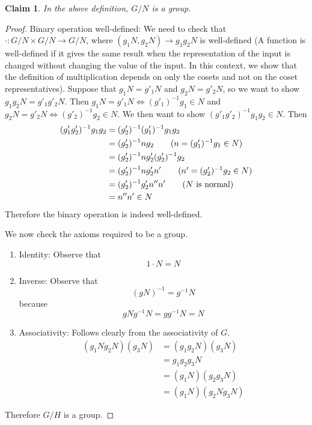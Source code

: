 \documentclass[12pt]{article}
\newtheorem{claim}{Claim}
\theoremstyle{definition}
\theoremstyle{definition}
\begin{document}
\begin{claim}
In the above definition, $G/N$ is a group. 
\end{claim}
\begin{proof}
Binary operation well-defined: We need to check that $\cdot: G/N \times G/N \to G/N$, where $(g_1N, g_2N) \to g_1 g_2 N$ is well-defined (A function is well-defined if it gives the same result when the representation of the input is changed without changing the value of the input. In this context, we show that the definition of multiplication depends on only the cosets and not on the coset representatives). Suppose that $g_1 N = g'_1 N$ and $g_2 N = g'_2 N$, so we want to show $g_1 g_2 N = g'_1 g'_2 N$. Then $g_1N = g'_1 N \iff (g'_1)^{-1} g_1 \in N$ and $g_2 N = g'_2 N \iff (g'_2)^{-1} g_2 \in N$. We then want to show $(g'_1g'_2)^{-1}g_1g_2 \in N$. Then
\begin{align*}
	(g'_1g'_2)^{-1}g_1g_2 &= (g'_2)^{-1} (g'_1)^{-1} g_1 g_2 \\
	&= (g'_2)^{-1} n g_2 \tag{$n = (g'_1)^{-1} g_1 \in N$} \\
	&= (g'_2)^{-1} n g'_2 (g'_2)^{-1} g_2 \\
	&= (g'_2)^{-1} n g'_2 n' \tag{$n' = (g'_2)^{-1} g_2 \in N$}\\
	&= (g'_2)^{-1} g'_2 n'' n' \tag{$N$ is normal}\\
	&= n'' n' \in N
\end{align*}
Therefore the binary operation is indeed well-defined. 

We now check the axioms required to be a group.

\begin{enumerate}
	\item Identity: Observe that
	\begin{equation}
		1 \cdot N = N
	\end{equation}

	\item Inverse: Observe that
	\begin{equation}
		(gN)^{-1} = g^{-1}N
	\end{equation}
	because 
	\begin{equation}
		gNg^{-1}N = gg^{-1} N = N
	\end{equation}

	\item Associativity: Follows clearly from the associativity of $G$. 
	\begin{align*}
		(g_1 N g_2 N)(g_3 N) &= (g_1 g_2 N)(g_3 N) \\
		&= g_1 g_2 g_3 N \\
		&= (g_1 N) (g_2 g_3 N) \\
		&= (g_1 N)(g_2 N g_3 N)
	\end{align*}
\end{enumerate}

Therefore $G/H$ is a group. 
\end{proof}
\end{document}
